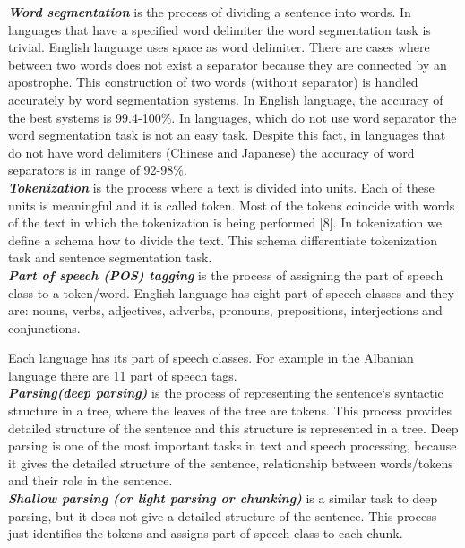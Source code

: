 \emph{ \textbf{ Word segmentation}} is the process of dividing a sentence into words. In languages that have a specified word delimiter the word segmentation task is trivial. English language uses space as word delimiter. There are cases where between  two words does not exist a separator because they are connected by an apostrophe. This construction of two words (without separator) is handled accurately by word segmentation systems. In English language, the accuracy of the best systems is 99.4-100\%. In languages, which do not use word separator the word segmentation task is not an easy task. Despite this fact, in languages that do not have word delimiters (Chinese and Japanese) the accuracy of word separators is in range of 92-98\%.\\

\emph{ \textbf{Tokenization}} is the process where a text is divided into units. Each of these units is meaningful and it is called token. Most of the tokens coincide with words of the text in which the tokenization is being performed [8]. In tokenization we define a schema how to divide the text. This schema differentiate tokenization task and sentence segmentation task. \\

\emph{ \textbf{Part of speech (POS) tagging}} is the process of assigning the part of speech class to a token/word. English language has eight part of speech classes and they are: nouns, verbs, adjectives, adverbs, pronouns, prepositions, interjections and conjunctions.

Each language has its part of speech classes. For example in the Albanian language there are 11 part of speech tags.\\

\emph{ \textbf{Parsing(deep parsing)}} is the process of representing the sentence`s syntactic structure in a tree, where the leaves of the tree are tokens. This process provides detailed structure of the sentence and this structure is represented in a tree. Deep parsing is one of the most important tasks in text and speech processing, because it gives the detailed structure of the sentence, relationship between words/tokens and their role in the sentence.\\ 

\emph{ \textbf{Shallow parsing (or light parsing or chunking)}} is a similar task to deep parsing, but it does not give a detailed structure of the sentence. This process just identifies the tokens and assigns part of speech class to each chunk.\\
 
